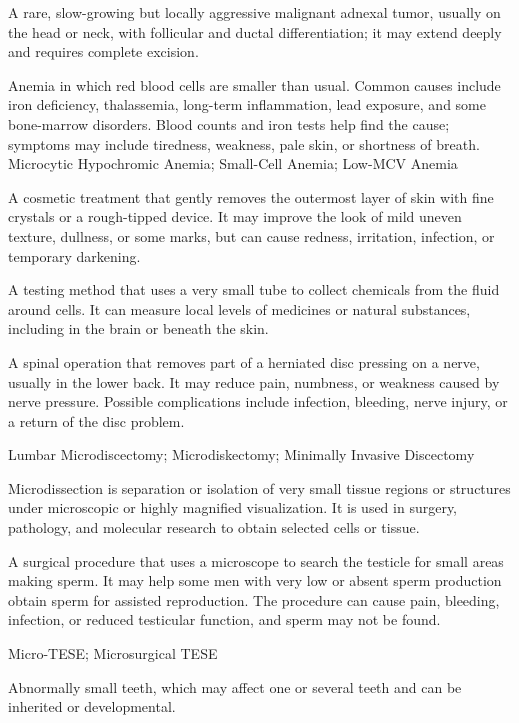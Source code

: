 A rare, slow-growing but locally aggressive malignant adnexal tumor, usually on the head or neck, with follicular and ductal differentiation; it may extend deeply and requires complete excision.

 Anemia in which red blood cells are smaller than usual. Common causes include iron deficiency, thalassemia, long-term inflammation, lead exposure, and some bone-marrow disorders. Blood counts and iron tests help find the cause; symptoms may include tiredness, weakness, pale skin, or shortness of breath.
\synonyms
Microcytic Hypochromic Anemia; Small-Cell Anemia; Low-MCV Anemia

 A cosmetic treatment that gently removes the outermost layer of skin with fine crystals or a rough-tipped device. It may improve the look of mild uneven texture, dullness, or some marks, but can cause redness, irritation, infection, or temporary darkening.

 A testing method that uses a very small tube to collect chemicals from the fluid around cells. It can measure local levels of medicines or natural substances, including in the brain or beneath the skin.

 A spinal operation that removes part of a herniated disc pressing on a nerve, usually in the lower back. It may reduce pain, numbness, or weakness caused by nerve pressure. Possible complications include infection, bleeding, nerve injury, or a return of the disc problem.

\synonyms
Lumbar Microdiscectomy; Microdiskectomy; Minimally Invasive Discectomy

 Microdissection is separation or isolation of very small tissue regions or structures under microscopic or highly magnified visualization. It is used in surgery, pathology, and molecular research to obtain selected cells or tissue.

 A surgical procedure that uses a microscope to search the testicle for small areas making sperm. It may help some men with very low or absent sperm production obtain sperm for assisted reproduction. The procedure can cause pain, bleeding, infection, or reduced testicular function, and sperm may not be found.

\synonyms
Micro-TESE; Microsurgical TESE

 Abnormally small teeth, which may affect one or several teeth and can be inherited or developmental.

